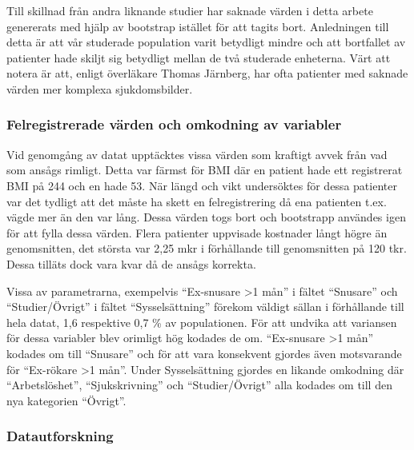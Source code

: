 Till skillnad från andra liknande studier har saknade värden i detta arbete genererats med hjälp av bootstrap istället för att tagits bort. Anledningen till detta är att vår studerade population varit betydligt mindre och att bortfallet av patienter hade skiljt sig betydligt mellan de två studerade enheterna. Värt att notera är att, enligt överläkare Thomas Järnberg,  har ofta patienter med saknade värden mer komplexa sjukdomsbilder. 

\subsubsection{Felregistrerade värden och omkodning av variabler}
Vid genomgång av datat upptäcktes vissa värden som kraftigt avvek från vad som ansågs rimligt. Detta var färmst för BMI där en patient hade ett registrerat BMI på 244 och en hade 53. När längd och vikt undersöktes för dessa patienter var det tydligt att det måste ha skett en felregistrering då ena patienten t.ex. vägde mer än den var lång. Dessa värden togs bort och bootstrapp användes igen för att fylla dessa värden. Flera patienter uppvisade kostnader långt högre än genomsnitten, det största var 2,25 mkr i förhållande till genomsnitten på 120 tkr. Dessa tilläts dock vara kvar då de ansågs korrekta.

Vissa av parametrarna, exempelvis “Ex-snusare \textgreater1 mån” i fältet “Snusare” och “Studier/Övrigt” i fältet “Sysselsättning” förekom väldigt sällan i förhållande till hela datat, 1,6 respektive 0,7 \% av populationen. För att undvika att variansen för dessa variabler blev orimligt hög kodades de om. “Ex-snusare \textgreater1 mån” kodades om till “Snusare” och för att vara konsekvent gjordes även motsvarande för “Ex-rökare \textgreater1 mån”. Under Sysselsättning gjordes en likande omkodning där “Arbetslöshet”, “Sjukskrivning” och “Studier/Övrigt” alla kodades om till den nya kategorien “Övrigt”.

\subsubsection{Datautforskning}

